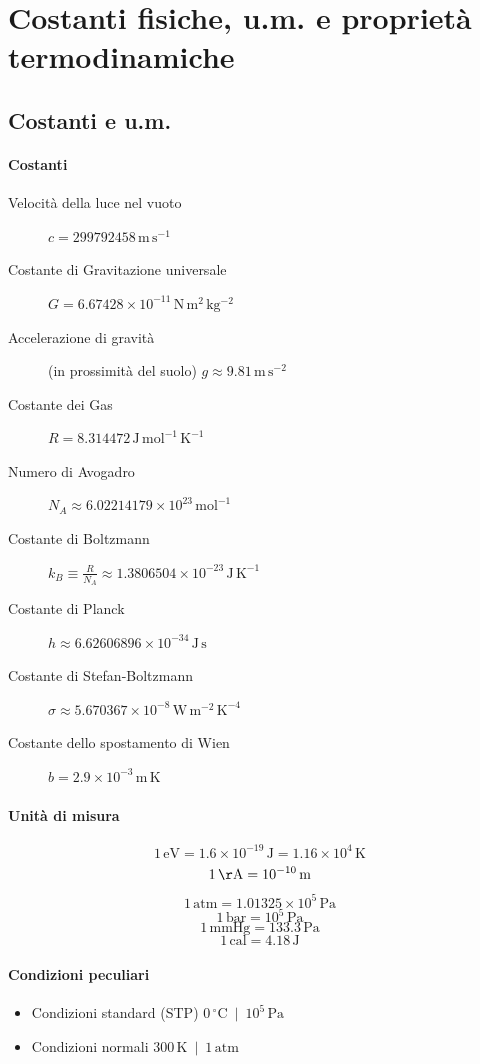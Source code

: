 \documentclass[10pt, oneside]{book}
\begin{document}
\section{Costanti fisiche, u.m. e proprietà termodinamiche}
\subsection*{Costanti e u.m.}
\paragraph{Costanti}
\begin{description}
\item[Velocità della luce nel vuoto] $\displaystyle c = 299792458 \, \mathrm{m \, s^{-1}}$
\item[Costante di Gravitazione universale] $\displaystyle G = 6.67428 \times 10^{-11} \, \mathrm{N \, m^2 \, kg^{-2}}$
\item[Accelerazione di gravità] (in prossimità del suolo) $\displaystyle g \approx 9.81 \, \mathrm{m \, s^{-2}}$
\item[Costante dei Gas] $\displaystyle R = 8.314472 \, \mathrm{J \, mol^{-1} \, K^{-1}}$
\item[Numero di Avogadro] $\displaystyle N_A \approx 6.02214179 \times 10^{23} \, \mathrm{mol^{-1}}$
\item[Costante di Boltzmann] $\displaystyle k_B \equiv \frac{R}{N_A} \approx 1.3806504 \times 10^{-23} \, \mathrm{J \, K^{-1}}$ 
\item[Costante di Planck] $\displaystyle h \approx 6.62606896 \times 10^{-34} \, \mathrm{J \, s}$
\item[Costante di Stefan-Boltzmann] $\displaystyle \sigma \approx 5.670367 \times 10^{-8} \, \mathrm{W \, m^{-2} \, K^{-4}}$
\item[Costante dello spostamento di Wien] $\displaystyle b = 2.9 \times 10^{-3} \, \mathrm{m \, K}$
\end{description}
\paragraph{Unità di misura}
\[1 \, \mathrm{eV} = 1.6 \times 10^{-19} \, \mathrm{J} = 1.16 \times 10^{4} \, \mathrm{K}\]
\[1 \, \mathrm{\AA} = 10^{-10} \, \mathrm{m}\]
\[1 \, \mathrm{atm} = 1.01325 \times 10^{5} \, \mathrm{Pa}\]
\[1 \, \mathrm{bar} = 10^{5} \, \mathrm{Pa}\]
\[1 \, \mathrm{mmHg} = 133.3 \, \mathrm{Pa}\]
\[1 \, \mathrm{cal} = 4.18 \, \mathrm{J}\]

\paragraph{Condizioni peculiari}
\begin{itemize}
\item Condizioni standard (STP) \dotfill $ 0 \, \mathrm{{}^\circ C} \enspace \big| \enspace 10^5 \, \mathrm{Pa}$
\item Condizioni normali \dotfill $ 300 \, \mathrm{K} \enspace \big| \enspace 1 \, \mathrm{atm}$

\end{itemize}
\end{document}
